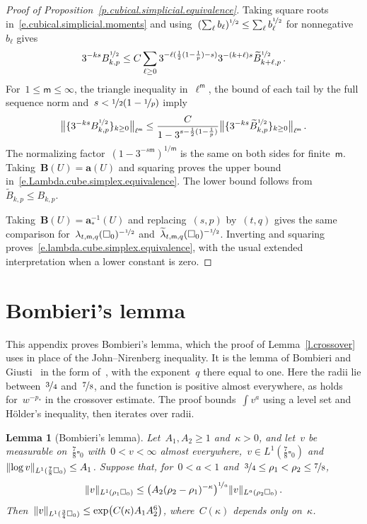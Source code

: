 \documentclass[11pt,letterpaper]{article}
\numberwithin{equation}{section}
\newtheorem{lemma}[theorem]{Lemma}
\theoremstyle{definition}
\renewcommand{\a}{\mathbf{a}}
\newcommand{\nf}{\nicefrac}
\newcommand{\cu}{\square}
\DeclarePairedDelimiter{\norm}{\lVert}{\rVert}
\begin{document}
\begin{proof}[Proof of Proposition~\ref{p.cubical.simplicial.equivalence}]
Taking square roots in~\eqref{e.cubical.simplicial.moments} and using~$(\sum_\ell b_\ell)^{\nf12}\leq\sum_\ell b_\ell^{\nf12}$ for nonnegative~$b_\ell$ gives
\begin{equation*}
	3^{-ks}B_{k,p}^{\nf12} \leq C\sum_{\ell\geq0} 3^{-\ell(\frac12(1-\frac1p)-s)} 3^{-(k+\ell)s}\widetilde B_{k+\ell,p}^{\nf12}\,.
\end{equation*}
For~$1\leq\mathsf m\leq\infty$, the triangle inequality in~$\ell^{\mathsf m}$, the bound of each tail by the full sequence norm and~$s<\nf12(1-\nf1p)$ imply
\begin{equation*}
	\bigl\|\{3^{-ks}B_{k,p}^{\nf12}\}_{k\geq0}\bigr\|_{\ell^{\mathsf m}} \leq\frac{C}{1-3^{s-\frac12(1-\frac1p)}} \bigl\|\{3^{-ks}\widetilde B_{k,p}^{\nf12}\}_{k\geq0} \bigr\|_{\ell^{\mathsf m}}\,.
\end{equation*}
The normalizing factor~$(1-3^{-s\mathsf m})^{1/\mathsf m}$ is the same on both sides for finite~$\mathsf m$. Taking~$\mathbf B(U)=\a(U)$ and squaring proves the upper bound in~\eqref{e.Lambda.cube.simplex.equivalence}. The lower bound follows from~$\widetilde B_{k,p}\leq B_{k,p}$.

Taking~$\mathbf B(U)=\a_*^{-1}(U)$ and replacing~$(s,p)$ by~$(t,q)$ gives the same comparison for~$\lambda_{t,\mathsf m,q}(\cu_0)^{-\nf12}$ and~$\widetilde\lambda_{t,\mathsf m,q}(\cu_0)^{-\nf12}$. Inverting and squaring proves~\eqref{e.lambda.cube.simplex.equivalence}, with the usual extended interpretation when a lower constant is zero.
\end{proof}

\section{Bombieri's lemma}
\label{a.bombieri}

This appendix proves Bombieri's lemma, which the proof of Lemma~\ref{l.crossover} uses in place of the John--Nirenberg inequality. It is the lemma of Bombieri and Giusti~\cite{Bombieri.Giusti} in the form of~\cite[Lemma~A.2]{AADKM}, with the exponent~$q$ there equal to one. Here the radii lie between~$\nf34$ and~$\nf78$, and the function is positive almost everywhere, as holds for~$w^{-p_*}$ in the crossover estimate. The proof bounds~$\int v^a$ using a level set and H\"older's inequality, then iterates over radii.

\begin{lemma}[Bombieri's lemma]
\label{l.bombieri}
Let~$A_1,A_2\geq1$ and~$\kappa>0$, and let~$v$ be measurable on~$\frac78\cu_0$ with~$0<v<\infty$ almost everywhere,~$v\in L^1(\frac78\cu_0)$ and~$\norm{\log v}_{L^1(\frac78\cu_0)}\leq A_1$. Suppose that, for~$0<a<1$ and~$\nf34\leq\rho_1<\rho_2\leq\nf78$,
\begin{equation}
	\norm{v}_{L^1(\rho_1\cu_0)}\leq\bigl(A_2(\rho_2-\rho_1)^{-\kappa}\bigr)^{\nf1a}\norm{v}_{L^a(\rho_2\cu_0)}\,.
	\label{e.bombieri.hypothesis}
\end{equation}
Then~$\norm{v}_{L^1(\frac34\cu_0)}\leq\exp\bigl(C(\kappa)A_1A_2^6\bigr)$, where~$C(\kappa)$ depends only on~$\kappa$.
\end{lemma}
\end{document}

